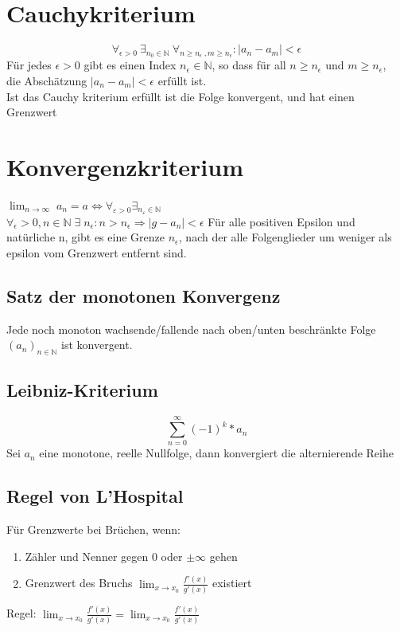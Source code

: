 \documentclass[12pt,a4paper]{article}
\begin{document}
\section{Cauchykriterium}
	$$\forall_{\epsilon>0}~\exists_{n_{0}\in\mathbb{N}} ~\forall_{n \geq n_{\epsilon}~, m \geq n_{\epsilon}}: | a_{n}-a_{m} | < \epsilon$$
	Für jedes $\epsilon > 0$ gibt es einen Index $n_{\epsilon} \in \mathbb{N}$, so dass für all $n\geq n_{\epsilon}$ und $m\geq n_{\epsilon}$,\\
	die Abschätzung $| a_{n}-a_{m} | < \epsilon$ erfüllt ist.\\
	Ist das Cauchy kriterium erfüllt ist die Folge konvergent, und hat einen Grenzwert

\section{Konvergenzkriterium}
	$\lim_{n \to \infty} \; a_n = a \Leftrightarrow \forall_{\varepsilon > 0} \exists _{n_\varepsilon \in  \mathbb{N}}$\\
	$\forall_\epsilon > 0, n \in \mathbb{N}\; \exists\; n_\epsilon: n > n_\epsilon \Rightarrow |g-a_n| < \epsilon $
	Für alle positiven Epsilon und natürliche n, gibt es eine Grenze $n_\epsilon $, nach der alle Folgenglieder um weniger als epsilon vom Grenzwert entfernt sind.\\ 

	\subsection{Satz der monotonen Konvergenz}
		Jede noch monoton wachsende/fallende nach oben/unten beschränkte Folge $(a_n)_{n \in \mathbb{N}}$ ist konvergent.\\

	\subsection{Leibniz-Kriterium}
		$$\sum^{\infty}_{n=0}{(-1)^k *a_n}$$
		Sei $a_n$ eine monotone, reelle Nullfolge, dann konvergiert die alternierende Reihe

	\subsection{Regel von L'Hospital}
		Für Grenzwerte bei Brüchen, wenn:
		\begin{enumerate}
			\item Zähler und Nenner gegen 0 oder $\pm \infty$ gehen
			\item Grenzwert des Bruchs $\lim_{x \to x_0} \frac{f'(x)}{g'(x)}$ existiert
		\end{enumerate}
		Regel: $\lim_{x \to x_0} \frac{f'(x)}{g'(x)} = \lim_{x \to x_0} \frac{f'(x)}{g'(x)}$
\end{document}
